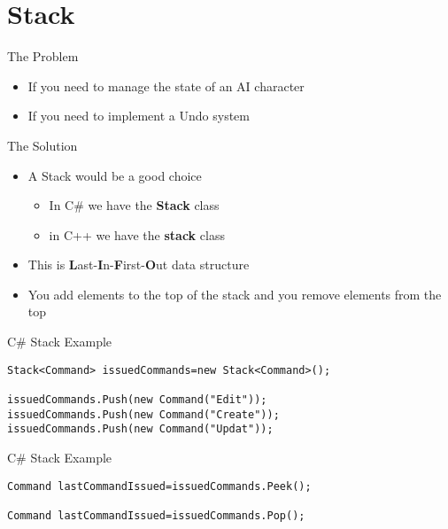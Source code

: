 \part{Stack}
\frame{\partpage}

\begin{frame}{The Problem}
	\begin{itemize}
		\pause \item If you need to manage the state of an AI character
		\pause \item If you need to implement a Undo system   
	\end{itemize}
\end{frame}

\begin{frame}{The Solution}
	\begin{itemize}
	\pause \item A Stack would be a good choice
	\begin{itemize}
		\pause \item In C\# we have the \textbf{Stack} class
		\pause \item in C++ we have the \textbf{stack} class
	\end{itemize}
	\pause \item This is \textbf{L}ast-\textbf{I}n-\textbf{F}irst-\textbf{O}ut data structure
	\pause \item You add elements to the top of the stack and you remove elements from the top
\end{itemize}
\end{frame}

\begin{frame}[fragile]{C\# Stack
Example}
\begin{lstlisting}
Stack<Command> issuedCommands=new Stack<Command>();

issuedCommands.Push(new Command("Edit"));
issuedCommands.Push(new Command("Create"));
issuedCommands.Push(new Command("Updat"));

\end{lstlisting}
\end{frame}

\begin{frame}[fragile]{C\# Stack
	Example}
\begin{lstlisting}
Command lastCommandIssued=issuedCommands.Peek();

Command lastCommandIssued=issuedCommands.Pop();
\end{lstlisting}
\end{frame}

